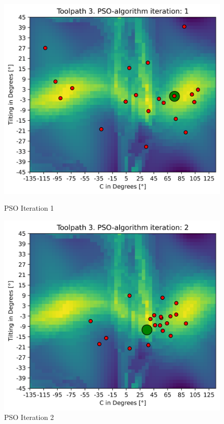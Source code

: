 \begin{figure}[H]
	\centering
	\begin{minipage}{0.5\textwidth}
		\includegraphics[width=\textwidth]{figures/swarm_true/3_1.png}
		\caption{PSO Iteration 1}
		\label{1_true}
	\end{minipage}\hfill
	\begin{minipage}{0.5\textwidth}
		\includegraphics[width=\textwidth]{figures/swarm_true/3_2.png}
		\caption{PSO Iteration 2}
		\label{2_true}
	\end{minipage}\par
\end{figure}	

